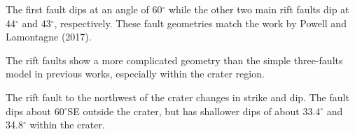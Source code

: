 \documentclass[draft]{agujournal2018}
\begin{document}




\begin{keypoints}
  \item The first fault dips at an angle of 60$^\circ$ while the other two main rift faults dip at 44$^\circ$ and 43$^\circ$, respectively. These fault geometries match the work by Powell and Lamontagne (2017).
  
  \item The rift faults show a more complicated geometry than the simple three-faults model in previous works, especially within the crater region.
  
  \item The rift fault to the northwest of the crater changes in strike and dip. The fault dips about 60$^\circ$SE outside the crater, but has shallower dips of about 33.4$^\circ$ and 34.8$^\circ$ within the crater. 
  
  
\end{keypoints}

%
%

\end{document}
